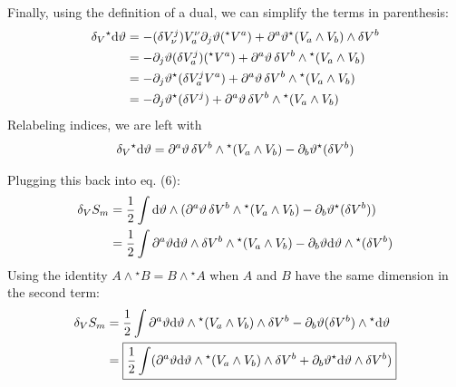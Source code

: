 \documentclass[12pt]{article}
\newcommand{\hodge}{{^\star}}
\begin{document}
Finally, using the definition of a dual, we can simplify the terms in parenthesis:
\begin{align*}
  \var_V\hodge\dd\vartheta &= -(\var V^j_\nu)V^\nu_a \partial_j\vartheta (\hodge V^a) + \partial^a\vartheta \hodge(V_a \wedge V_b) \wedge \var{V^b} \\
  &= -\partial_j\vartheta (\var V^j_a) (\hodge V^a) + \partial^a\vartheta \var{V^b} \wedge \hodge(V_a \wedge V_b) \\
  &= -\partial_j\vartheta \hodge(\var V^j_a V^a) + \partial^a\vartheta \var{V^b} \wedge \hodge(V_a \wedge V_b) \\
  &= -\partial_j\vartheta \hodge(\var V^j) + \partial^a\vartheta \var{V^b} \wedge \hodge(V_a \wedge V_b) \\
\end{align*}
Relabeling indices, we are left with
\begin{align}
  \var_V\hodge\dd\vartheta = \partial^a\vartheta \var{V^b} \wedge \hodge(V_a \wedge V_b) -\partial_b\vartheta \hodge(\var V^b)
\end{align}

Plugging this back into eq. (6):
\begin{align*}
  \var_V{S_m} &= \frac{1}{2} \int \dd\vartheta \wedge (\partial^a\vartheta \var{V^b} \wedge \hodge(V_a \wedge V_b) -\partial_b\vartheta \hodge(\var V^b)) \\
   &= \frac{1}{2} \int \partial^a\vartheta \dd\vartheta \wedge \var{V^b} \wedge \hodge(V_a \wedge V_b) - \partial_b\vartheta \dd\vartheta \wedge \hodge(\var V^b) \\
\end{align*}
Using the identity $A \wedge \hodge B = B \wedge \hodge A$ when $A$ and $B$ have the same dimension in the second term:
\begin{align}
  \var_V{S_m} &= \frac{1}{2} \int \partial^a\vartheta \dd\vartheta \wedge \hodge(V_a \wedge V_b) \wedge \var{V^b} - \partial_b\vartheta (\var V^b) \wedge \hodge\dd\vartheta \nonumber \\
  &= \boxed{\frac{1}{2} \int (\partial^a\vartheta \dd\vartheta \wedge \hodge(V_a \wedge V_b) \wedge \var{V^b} + \partial_b\vartheta \hodge\dd\vartheta \wedge \var{V^b})}
\end{align}
\end{document}
